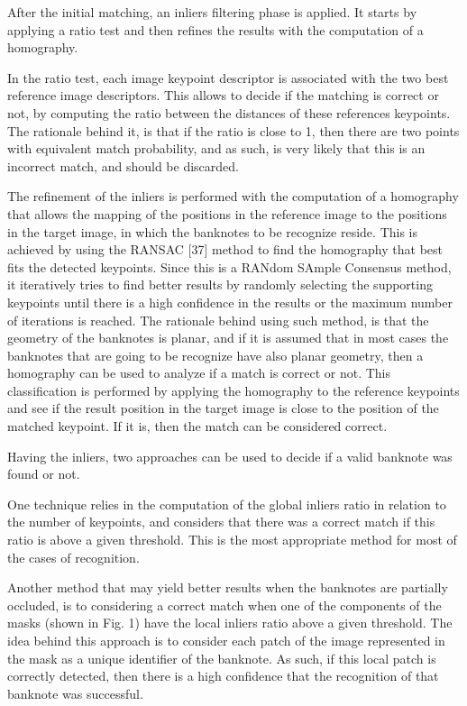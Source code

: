 After the initial matching, an inliers filtering phase is applied. It starts by applying a ratio test and then refines the results with the computation of a homography.

In the ratio test, each image keypoint descriptor is associated with the two best reference image descriptors. This allows to decide if the matching is correct or not, by computing the ratio between the distances of these references keypoints. The rationale behind it, is that if the ratio is close to 1, then there are two points with equivalent match probability, and as such, is very likely that this is an incorrect match, and should be discarded.

The refinement of the inliers is performed with the computation of a homography that allows the mapping of the positions in the reference image to the positions in the target image, in which the banknotes to be recognize reside. This is achieved by using the RANSAC [37] method to find the homography that best fits the detected keypoints. Since this is a RANdom SAmple Consensus method, it iteratively tries to find better results by randomly selecting the supporting keypoints until there is a high confidence in the results or the maximum number of iterations is reached. The rationale behind using such method, is that the geometry of the banknotes is planar, and if it is assumed that in most cases the banknotes that are going to be recognize have also planar geometry, then a homography can be used to analyze if a match is correct or not. This classification is performed by applying the homography to the reference keypoints and see if the result position in the target image is close to the position of the matched keypoint. If it is, then the match can be considered correct.

Having the inliers, two approaches can be used to decide if a valid banknote was found or not.

One technique relies in the computation of the global inliers ratio in relation to the number of keypoints, and considers that there was a correct match if this ratio is above a given threshold. This is the most appropriate method for most of the cases of recognition.

Another method that may yield better results when the banknotes are partially occluded, is to considering a correct match when one of the components of the masks (shown in Fig. 1) have the local inliers ratio above a given threshold. The idea behind this approach is to consider each patch of the image represented in the mask as a unique identifier of the banknote. As such, if this local patch is correctly detected, then there is a high confidence that the recognition of that banknote was successful.


